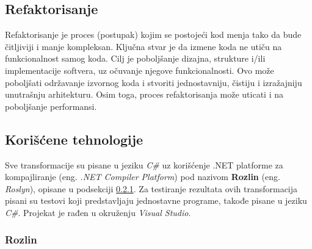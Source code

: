 \documentclass[a4paper]{article}
\begin{document}
{\subsection{Refaktorisanje}
\label{subsec:refaktorisanje}

Refaktorisanje je proces (postupak) kojim se postojeći kod menja tako da bude čitljiviji i manje kompleksan. Ključna stvar je da izmene koda ne utiču na funkcionalnost samog koda. Cilj je poboljšanje dizajna, strukture i/ili implementacije softvera, uz očuvanje njegove funkcionalnosti. Ovo može poboljšati održavanje izvornog koda i stvoriti jednostavniju, čistiju i izražajniju unutrašnju arhitekturu. Osim toga, proces refaktorisanja može uticati i na poboljšanje performansi.




\subsection{Korišćene tehnologije}
\label{subsec:koriscene_tehnologije}

Sve transformacije su pisane u jeziku \textit{C\#} uz korišćenje .NET platforme za kompajliranje (eng. \textit{.NET Compiler Platform}) pod nazivom \textbf{Rozlin}
(eng. \textit{Roslyn}), opisane u podsekciji \ref{subsubsec:rozlin}. Za testiranje rezultata ovih transformacija pisani su testovi koji predstavljaju jednostavne programe, takođe pisane u jeziku \textit{C\#}. Projekat je rađen u okruženju \textit{Visual Studio}.

\subsubsection{Rozlin}
\label{subsubsec:rozlin}

}
\end{document}
